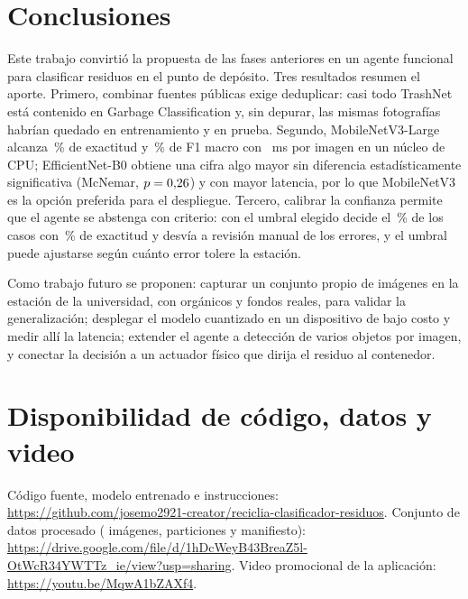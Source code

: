 \documentclass[conference,a4paper]{IEEEtran}
\newcommand{\linkGithub}{\url{https://github.com/josemo2921-creator/reciclia-clasificador-residuos}}
\newcommand{\linkDrive}{\url{https://drive.google.com/file/d/1hDcWeyB43BreaZ5l-OtWcR34YWTTz_ie/view?usp=sharing}}
\newcommand{\linkVideo}{\url{https://youtu.be/MqwA1bZAXf4}}
\begin{document}
\section{Conclusiones}\label{sec:conclusiones}
Este trabajo convirtió la propuesta de las fases anteriores en un agente funcional para clasificar residuos en el punto de depósito. Tres resultados resumen el aporte. Primero, combinar fuentes públicas exige deduplicar: casi todo TrashNet está contenido en Garbage Classification y, sin depurar, las mismas fotografías habrían quedado en entrenamiento y en prueba. Segundo, MobileNetV3-Large alcanza \accMN\,\% de exactitud y \fMN\,\% de F1 macro con \latUnoMN~ms por imagen en un núcleo de CPU; EfficientNet-B0 obtiene una cifra algo mayor sin diferencia estadísticamente significativa (McNemar, $p=0{,}26$) y con mayor latencia, por lo que MobileNetV3 es la opción preferida para el despliegue. Tercero, calibrar la confianza permite que el agente se abstenga con criterio: con el umbral elegido decide el \cobMN\,\% de los casos con \accSelMN\,\% de exactitud y desvía a revisión manual \errRevMN{} de los \errTotMN{} errores, y el umbral puede ajustarse según cuánto error tolere la estación.

Como trabajo futuro se proponen: capturar un conjunto propio de imágenes en la estación de la universidad, con orgánicos y fondos reales, para validar la generalización; desplegar el modelo cuantizado en un dispositivo de bajo costo y medir allí la latencia; extender el agente a detección de varios objetos por imagen, y conectar la decisión a un actuador físico que dirija el residuo al contenedor.

\section*{Disponibilidad de código, datos y video}
Código fuente, modelo entrenado e instrucciones: \linkGithub. Conjunto de datos procesado (\nTotal{} imágenes, particiones y manifiesto): \linkDrive. Video promocional de la aplicación: \linkVideo.

\balance


\end{document}
